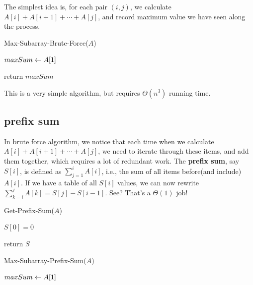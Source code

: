 \begin{spacing}{1.3}
    The simplest idea is, for each pair $(i,j)$, we calculate
    $A[i]+A[i+1]+\cdots+A[j]$, and record maximum value 
    we have seen along the process.

    \begin{algorithm}
        \caption{Max-Subarray-Brute-Force($A$)}
        $maxSum \leftarrow A[1]$ \qquad {}

        return $maxSum$
    \end{algorithm}

    This is a very simple algorithm, but requires $\Theta(n^3)$ running time.

    \subsection{prefix sum}

    In brute force algorithm, we notice that each time when we 
    calculate $A[i]+A[i+1]+\cdots+A[j]$, we need to iterate through 
    these items, and add them together, which requires a lot of 
    redundant work. The {\bf prefix sum}, say $S[i]$, is defined 
    as $\sum_{j=1}^{i} A[i]$, i.e., the sum of all items before(and include)
    $A[i]$. If we have a table of all $S[i]$ values, we can now rewrite 
    $\sum_{k=i}^{j} A[k]=S[j]-S[i-1]$. See? That's a $\Theta(1)$ job!

    \vspace{0.2in}
    \begin{algorithm}
        \caption{Get-Prefix-Sum($A$)}
        $S[0]=0$

        return $S$
    \end{algorithm}

    \begin{algorithm}[H]
        \caption{Max-Subarray-Prefix-Sum($A$)}
        $maxSum \leftarrow A[1]$ 


\end{algorithm}
\end{spacing}

